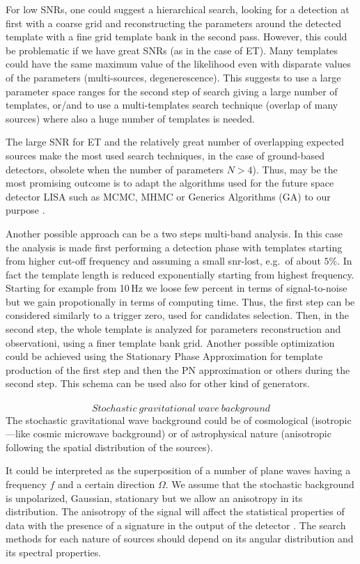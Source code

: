 For low SNRs, one could suggest a hierarchical search, looking for a detection at first with a coarse grid and reconstructing the parameters around the detected template with a fine grid template bank in the second pass. However, this could be problematic if we have great SNRs (as in the case of ET). Many templates could have the same maximum value of the likelihood even with disparate values of the parameters (multi-sources, degenerescence). This suggests to use a large parameter space ranges for the second step of search giving a large number of templates, or/and to use a multi-templates search technique (overlap of many sources) where also a huge number of templates is needed. 


The large SNR for ET and the relatively great number of overlapping expected sources  make the most used search techniques, in the case of ground-based detectors, obsolete when  the number of parameters  $N > 4$). Thus, may be the most promising  outcome is to adapt the algorithms used for the future space detector LISA such as MCMC, MHMC or Generics Algorithms (GA) to our purpose \cite{PETITEAU2010}.

Another possible approach can be a two steps  multi-band analysis. In this case the analysis is made first performing a detection phase with templates starting from higher cut-off frequency and assuming a small snr-lost, e.g.\ of about $5\%$. In fact the template length is reduced exponentially starting from highest frequency. Starting for example from 10\,Hz we loose few percent in terms of signal-to-noise but we gain propotionally in terms of computing time.   Thus, the first step can be considered similarly to a trigger zero, used for candidates selection. Then, in the second step, the whole template  is analyzed  for parameters reconstruction and observationi, using a finer template bank grid. Another possible optimization could be achieved using the Stationary Phase Approximation for template production of the first step  and then the PN approximation or others during the second step. This schema can be used also for other kind of generators. 
\\
\\
 
 {\bf \[  Stochastic ~ gravitational~ wave~ background \]}  
The stochastic gravitational wave background could be of cosmological (isotropic---like cosmic microwave background)  or of astrophysical nature (anisotropic following the spatial distribution of the sources).

It could be interpreted as the superposition of a number of plane waves having a frequency $f$ and a certain direction $\Omega$. We assume that the stochastic background is unpolarized, Gaussian, stationary but we allow an anisotropy in its distribution.
The anisotropy of the signal will affect the statistical properties of data with the presence of a signature in the output of the detector \cite{THRANE2009}.
The search methods for each nature of sources should depend on its angular distribution and its spectral properties. 

